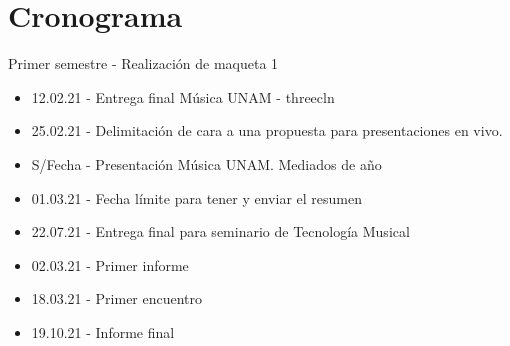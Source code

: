 \section*{Cronograma}

Primer semestre - Realización de maqueta 1

\begin{itemize}

\item 12.02.21 - Entrega final Música UNAM - threecln
\item 25.02.21 - Delimitación de cara a una propuesta para presentaciones en vivo.
\item S/Fecha - Presentación Música UNAM. Mediados de año

\item 01.03.21 - Fecha límite para tener y enviar el resumen
\item 22.07.21 - Entrega final para seminario de Tecnología Musical

\item 02.03.21 - Primer informe
\item 18.03.21 - Primer encuentro
\item 19.10.21 - Informe final

 \end{itemize}
